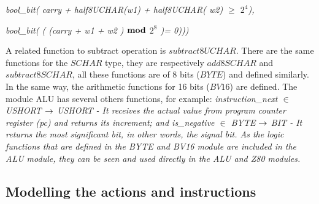 \documentclass[a4paper]{llncs}
\begin{document}
\hspace*{0.40in}\it bool\_bit\rm ( \it carry \rm + \it half8UCHAR\rm (\it w1\rm ) \rm + \it half8UCHAR\rm ( \it
w2\rm )  $\geq$  \it $2^{4}$\rm )\rm,

\hspace*{0.40in}\it bool\_bit\rm ( \rm ( \rm (\it carry \rm + \it w1 \rm + \it w2 \rm )  $\mod$  \it $2^{8}$ \rm
)\rm = \rm 0\rm )\rm )\hspace*{0.10in}\rm )

\hspace*{0.20in}

A related function to subtract operation is $\textit{subtract8UCHAR}$. There are the same functions for the
$\textit{SCHAR}$ type, they are respectively $\textit{add8SCHAR}$ and $\textit{subtract8SCHAR}$, all these
functions are of 8 bits ($\textit{BYTE}$) and defined similarly. In the same way, the arithmetic functions for 16
bits ($\textit{BV16}$) are defined.
The module ALU has several others functions, for example:%
\it instruction\_next  $\in$  USHORT  $\fun$  USHORT \rm - It receives the  
  actual value from program counter register (\textit{pc}) and returns its increment;
and \it is\_negative  $\in$  \it BYTE  $\fun$  \it BIT \rm - It returns the most significant bit,
 in other words, the signal bit.
As the logic functions that are defined in the \textit{BYTE} and \textit{BV16}
module are included in the \textit{ALU} module, they can be seen and used
directly in the \textit{ALU} and \textit{Z80} modules.

\subsection{Modelling the actions and instructions}
\end{document}
